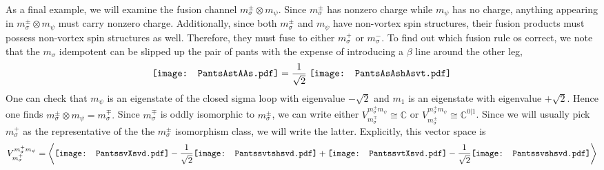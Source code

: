 \documentclass[12pt,a4paper]{article}
\newcommand{\tp}{\otimes}
\newcommand{\cc}{\mathbb{C}}
\newcommand{\fld}{\mathcal{F}} %
\newcommand{\PantsAsAshAsvt}{\mathord{\vcenter{\hbox{\texttt{[image: PantsAsAshAsvt.pdf]}}}}}
\newcommand{\PantsAstAAs}{\mathord{\vcenter{\hbox{\texttt{[image: PantsAstAAs.pdf]}}}}}
\newcommand{\PantsAstAshAs}{\mathord{\vcenter{\hbox{\texttt{[image: PantsAstAshAs.pdf]}}}}}
\newcommand{\PantsAsAshAs}{\mathord{\vcenter{\hbox{\texttt{[image: PantsAsAshAs.pdf]}}}}}
\newcommand{\PantsAsAAs}{\mathord{\vcenter{\hbox{\texttt{[image: PantsAsAAs.pdf]}}}}}
\newcommand{\PantssvtXsvd}{\mathord{\vcenter{\hbox{\texttt{[image: PantssvtXsvd.pdf]}}}}}
\newcommand{\Pantssvtshsvd}{\mathord{\vcenter{\hbox{\texttt{[image: Pantssvtshsvd.pdf]}}}}}
\newcommand{\Pantssvshsvd}{\mathord{\vcenter{\hbox{\texttt{[image: Pantssvshsvd.pdf]}}}}}
\newcommand{\PantssvXsvd}{\mathord{\vcenter{\hbox{\texttt{[image: PantssvXsvd.pdf]}}}}}
\begin{document}
As a final example, we will examine the fusion channel $m_\sigma^{\pm} \tp m_\psi$. 
Since $m_\sigma^{\pm}$ has nonzero charge while $m_\psi$ has no charge, anything appearing in $m_\sigma^\pm \tp m_\psi$ must carry nonzero charge. Additionally, since both $m_\sigma^\pm$ and $m_\psi$ have non-vortex spin structures, their fusion products must possess non-vortex spin structures as well. Therefore, they must fuse to either $m_\sigma^+$ or $m_\sigma^-$. To find out which fusion rule os correct, we note that the $m_\sigma$ idempotent can be slipped up the pair of pants with the expense of introducing a $\beta$ line around the other leg,
\begin{align}
\PantsAstAAs  = \frac{1}{\sqrt{2}} \;  \PantsAsAshAsvt
\end{align}
One can check that $m_\psi$ is an eigenstate of the closed sigma loop with eigenvalue $-\sqrt{2}$ and $m_1$ is an eigenstate with eigenvalue $+\sqrt{2}$. Hence one finds $m_\sigma^{\pm} \tp m_\psi  = m_\sigma^{\mp}.$ Since $m^\mp_\sigma$ is oddly isomorphic to $m_\sigma^\pm$, we can write either $V^{m_\sigma^\pm m_\psi}_{m_\sigma^\mp} \cong \cc$ or $V^{m_\sigma^\pm m_\psi}_{m_\sigma^\pm} \cong \cc^{0|1}$. Since we will usually pick $m_\sigma^+$ as the representative of the the $m_\sigma^\pm$ isomorphism class, we will write the latter.
Explicitly, this vector space is
\begin{align}
V^{m_\sigma^+ m_\psi}_{m_\sigma^+} = \left\langle \PantssvXsvd -\frac{1}{\sqrt{2}}\Pantssvtshsvd + \PantssvtXsvd  - \frac{1}{\sqrt{2}} \Pantssvshsvd   \right \rangle 
\end{align}
\end{document}
